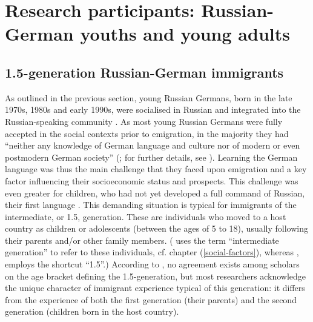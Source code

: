 \section{Research participants: Russian-German youths and young adults}{\label{junge-ru-de}}
\subsection{1.5-generation Russian-German immigrants}
As outlined in the previous section, young Russian Germans, born in the late 1970s, 1980s and early 1990s, were socialised in Russian \citep[cf.][106]{meng01} and integrated into the Russian-speaking community \citep[cf.][275]{roll03}. As most young Russian Germans were fully accepted in the social contexts prior to emigration, in the majority they had ``neither any knowledge of German language and culture nor of modern or even postmodern German society'' (\citealt[272]{roll03}; for further details, see \citealt{dietz-roll198}). Learning the German language was thus the main challenge that they faced upon emigration and a key factor influencing their socioeconomic status and prospects. This challenge was even greater for children, who had not yet developed a full command of Russian, their first language \citep[cf.][106-152]{meng01}. This demanding situation is typical for immigrants of the intermediate, or 1.5, generation.  These are individuals who moved to a host country as children or adolescents (between the ages of 5 to 18), usually following their parents and/or other family members. (\citealt{backus1999,backus06} uses the term “intermediate generation” to refer to these individuals, cf. chapter (\ref{social-factors}), whereas \citealt{remennickTA}, employs the shortcut “1.5”.)  According to \citet{remennickTA}, no agreement exists among scholars on the age bracket defining the 1.5-generation, but most researchers acknowledge the unique character of immigrant experience typical of this generation: it differs from the experience of both the first generation (their parents) and the second generation (children born in the host country). 

